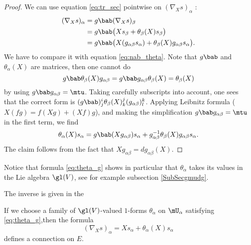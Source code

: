 \begin{proof}
We can use equation \eqref{eq:tr_sec} pointwise on $(\nabla_X s)_{\alpha}$ :
\begin{equation}
\begin{split}
(\nabla_X s)_{\alpha}&=g\bab(\nabla_Xs)_{\beta}\\
                  &=g\bab\big(   Xs_{\beta}+\theta_{\beta}(X)s_{\beta}   \big) \\
                  &=g\bab\big(   X(g_{\alpha\beta} s_{\alpha})+\theta_{\beta}(X)g_{\alpha\beta} s_{\alpha}   \big).
\end{split}
\end{equation} 
We have to compare it with equation \eqref{eq:nab_theta}. Note that $g\bab$ and $\theta_{\alpha}(X)$ are matrices, then one cannot do
\[
   g\bab\theta_{\beta}(X)g_{\alpha\beta} =g\bab g_{\alpha\beta}\theta_{\beta}(X)=\theta_{\beta}(X)
\]
by using $g\bab g_{\alpha\beta}=\mtu$.  Taking carefully subscripts into account, one sees that the correct form is $(g\bab)^i_j\theta_{\beta}(X)^j_k(g_{\alpha\beta})^k_l$. Applying Leibnitz formula ($X(fg)=f(Xg)+(Xf)g$), and making the simplification $g\bab g_{\alpha\beta}=\mtu$ in the first term, we find
\[
  \theta_{\alpha}(X)s_{\alpha}=g\bab(Xg_{\alpha\beta})s_{\alpha}+g_{\alpha\beta}^{-1}\theta_{\beta}(X)g_{\alpha\beta} s_{\alpha}.
\]
The claim follows from the fact that $Xg_{\alpha\beta}=dg_{\alpha\beta}(X)$.
\end{proof}

Notice that formula \eqref{eq:theta_g} shows in particular that $\theta_{\alpha}$ takes its values in the Lie algebra $\gl(V)$, see for example subsection \ref{SubSecgmudg}.

The inverse is given in the
\begin{proposition}	\label{Propformconnve}
If we choose a family of $\gl(V)$-valued $1$-forms $\theta_{\alpha}$ on $\mU_{\alpha}$ satisfying \eqref{eq:theta_g},then the formula
\[
  (\nabla_Xs)_{\alpha}=Xs_{\alpha}+\theta_{\alpha}(X)s_{\alpha}
\]
defines a connection on $E$.\label{prop:thet_conn_F}
\end{proposition}

